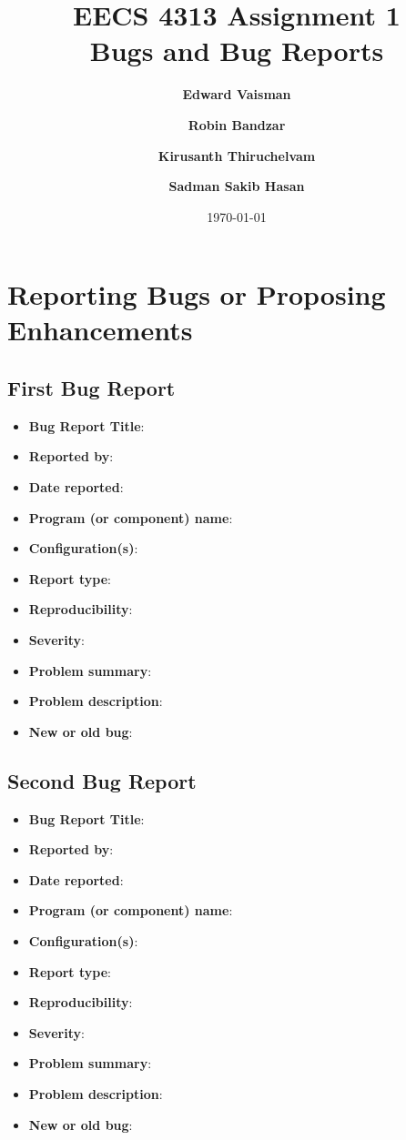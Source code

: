 \documentclass[fontsize=12pt,paper=letter,twoside]{scrartcl}
\author{\textbf{Edward Vaisman}
\and \textbf{Robin Bandzar}
\and \textbf{Kirusanth Thiruchelvam}
\and \textbf{Sadman Sakib Hasan}
}
\date{\today} %
\begin{document}
\title{EECS 4313 Assignment 1 \\Bugs and Bug Reports}
\maketitle

\newpage

\tableofcontents


\newpage



\section{Reporting Bugs or Proposing Enhancements}

\subsection{First Bug Report}

\begin{itemize}
\item \textbf{Bug Report Title}:
\item \textbf{Reported by}:
\item \textbf{Date reported}:
\item \textbf{Program (or component) name}:
\item \textbf{Configuration(s)}:
\item \textbf{Report type}:
\item \textbf{Reproducibility}:
\item \textbf{Severity}:
\item \textbf{Problem summary}:
\item \textbf{Problem description}:
\item \textbf{New or old bug}:
\end{itemize}

\newpage
\subsection{Second Bug Report}

\begin{itemize}
\item \textbf{Bug Report Title}:
\item \textbf{Reported by}:
\item \textbf{Date reported}:
\item \textbf{Program (or component) name}:
\item \textbf{Configuration(s)}:
\item \textbf{Report type}:
\item \textbf{Reproducibility}:
\item \textbf{Severity}:
\item \textbf{Problem summary}:
\item \textbf{Problem description}:
\item \textbf{New or old bug}:
\end{itemize}
\end{document}
